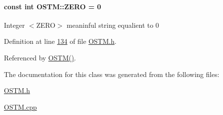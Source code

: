 \paragraph[{\texorpdfstring{Z\+E\+RO}{ZERO}}]{\setlength{\rightskip}{0pt plus 5cm}const int O\+S\+T\+M\+::\+Z\+E\+RO = 0\hspace{0.3cm}{\ttfamily [private]}}\hypertarget{class_o_s_t_m_a0bb6ae8411d25f8e7b82d0a61729ea89_a0bb6ae8411d25f8e7b82d0a61729ea89}{}\label{class_o_s_t_m_a0bb6ae8411d25f8e7b82d0a61729ea89_a0bb6ae8411d25f8e7b82d0a61729ea89}
Integer $<$\+Z\+E\+R\+O$>$ meaninful string equalient to 0 

Definition at line \hyperlink{_o_s_t_m_8h_source_l00134}{134} of file \hyperlink{_o_s_t_m_8h_source}{O\+S\+T\+M.\+h}.



Referenced by \hyperlink{_o_s_t_m_8cpp_source_l00021}{O\+S\+T\+M()}.



The documentation for this class was generated from the following files\+:\begin{DoxyCompactItemize}
\item 
\hyperlink{_o_s_t_m_8h}{O\+S\+T\+M.\+h}\item 
\hyperlink{_o_s_t_m_8cpp}{O\+S\+T\+M.\+cpp}\end{DoxyCompactItemize}
